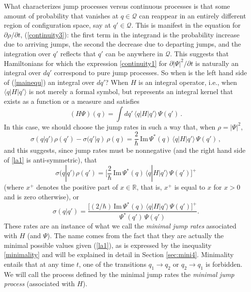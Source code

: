 \documentclass[12pt]{article}
\newcommand{\RRR}{\mathbb{R}} %
\newcommand{\1}{\mathbf{1}} %
\renewcommand{\Im}{\mathrm{Im}} %
\renewcommand{\sp}[2]{\langle #1 | #2 \rangle} %
\newcommand{\conf}{\mathcal{Q}} %
\begin{document}
What characterizes jump processes versus continuous processes is that
some amount of probability that vanishes at $q\in\conf$ can reappear
in an entirely different region of configuration space, say at
$q'\in\conf$. This is manifest in the equation for $\partial
\rho/\partial t$, (\ref{continuity3}): the first term in the integrand
is the probability increase due to arriving jumps, the second the
decrease due to departing jumps, and the integration over $q'$
reflects that $q'$ can be anywhere in $\conf$. This suggests that
Hamiltonians for which the expression \eqref{continuity1} for
$\partial |\Psi|^2/\partial t$ is naturally an integral over $dq'$
correspond to pure jump processes. So when is the left hand side of
(\ref{mainequ}) an integral over $dq'$?  When $H$ is an integral
operator, i.e., when $\sp{q}{H|q'}$ is not merely a formal symbol, but
represents an integral kernel that exists as a function or a measure and
satisfies
\begin{equation}
   (H\Psi)(q) = \int dq'\,\sp{q}{H|q'}\, \Psi(q')\,.
\end{equation}
In this case, we should choose the jump rates in such a way that,
when $\rho = |\Psi|^2$,
\begin{equation}\label{la1}
   \sigma(q|q') \,\rho(q') - \sigma(q'|q) \,\rho(q) = \frac{2}{\hbar}
   \, \Im \, \Psi^*(q)\, \sp{q}{H|q'} \, \Psi(q') \,,
\end{equation}
and this suggests, since jump rates must be nonnegative (and the right
hand side of \eqref{la1} is anti-symmetric), that
\[
   \sigma(q|q') \,\rho(q') = \Big[ \frac{2}{\hbar} \, \Im \,
   \Psi^*(q)\, \sp{q}{H|q'} \, \Psi(q') \Big]^+
\]
(where $x^+$ denotes the positive part of $x\in\RRR$, that is, $x^+$ is
equal to $x $ for $x>0$ and is zero otherwise), or
\begin{equation}\label{mini1}
   \sigma(q|q') = \frac{ \big[ (2/\hbar) \, \Im \, \Psi^*(q) \, \sp{q}
   {H|q'} \, \Psi(q') \big]^+}{\Psi^*(q')\, \Psi(q')} .
\end{equation}
These rates are an instance of what we call the \emph{minimal jump
rates} associated with $H$ (and $\Psi$).  The name comes from the fact
that they are actually the minimal possible values given (\ref{la1}),
as is expressed by the inequality \eqref{minimality} and will be
explained in detail in Section \ref{sec:mini4}.  Minimality entails
that at any time $t$, one of the transitions $q_1 \to q_2$ or $q_2 \to
q_1$ is forbidden. We will call the process defined by the minimal
jump rates the \emph{minimal jump process} (associated with $H$).
\end{document}
